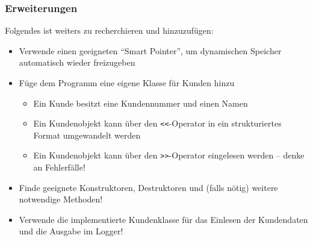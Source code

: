 \documentclass[]{beamer}
\newcommand{\bi}{\begin{itemize}}
\newcommand{\ei}{\end{itemize}}
\begin{document}
\begin{frame}
	\frametitle{Erweiterungen}
	
	Folgendes ist weiters zu recherchieren und hinzuzufügen:
	\bi
	\item Verwende einen geeigneten "`Smart Pointer"', um \newline dynamischen Speicher automatisch wieder freizugeben
	\item Füge dem Programm eine eigene Klasse für Kunden hinzu
	\bi
	\item Ein Kunde besitzt eine Kundennummer und einen Namen
	\item Ein Kundenobjekt kann über den \lstinline|<<|-Operator in ein strukturiertes Format umgewandelt werden
	\item Ein Kundenobjekt kann über den \lstinline|>>|-Operator eingelesen werden -- denke an Fehlerfälle!
	\ei
	\item Finde geeignete Konstruktoren, Destruktoren und (falls nötig) weitere notwendige Methoden!
	\item Verwende die implementierte Kundenklasse für das Einlesen der Kundendaten und die Ausgabe im Logger!
	\ei
\end{frame}

	
		
\end{document}
